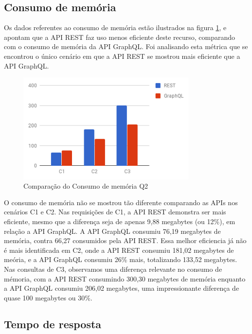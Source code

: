 \subsection{Consumo de memória}

Os dados referentes ao consumo de memória estão ilustrados na figura \ref{fig:q2-mem}, e apontam que a API REST faz uso menos eficiente deste recurso, comparando com o consumo de memória da API GraphQL. Foi analisando esta métrica que se encontrou o único cenário em que a API REST se mostrou mais eficiente que a API GraphQL.

\begin{figure}[htbp]
    \centering
    \includegraphics[width=0.8\textwidth]{figuras/q2-memory.png}
    \caption{Comparação do Consumo de memória Q2}
    \label{fig:q2-mem}
    \author{fonte: Autor}
\end{figure}

O consumo de memória não se mostrou tão diferente comparando as APIs nos cenários C1 e C2. Nas requisições de C1, a API REST demonstra ser mais eficiente, mesmo que a diferença seja de apenas 9,88 megabytes (ou 12\%), em relação a API GraphQL. A API GraphQL consumiu 76,19 megabytes de memória, contra 66,27 consumidos pela API REST. Essa melhor eficiencia já não é mais identificada em C2, onde a API REST consumiu 181,02 megabytes de meória, e a API GraphQL consumiu 26\% mais, totalizando 133,52 megabytes. Nas consultas de C3, observamos uma diferença relevante no consumo de mémoria, com a API REST consumindo 300,30 megabytes de memória enquanto a API GraphQL consumiu 206,02 megabytes, uma impressionante diferença de quase 100 megabytes ou 30\%.

\subsection{Tempo de resposta}

